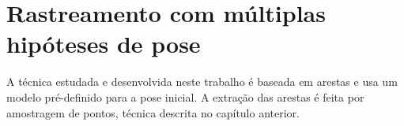 \chapter{Rastreamento com múltiplas hipóteses de pose}

A técnica estudada e desenvolvida neste trabalho é baseada em arestas e usa um modelo pré-definido para a pose inicial. A extração das arestas é feita por amostragem de pontos, técnica descrita no capítulo anterior.

